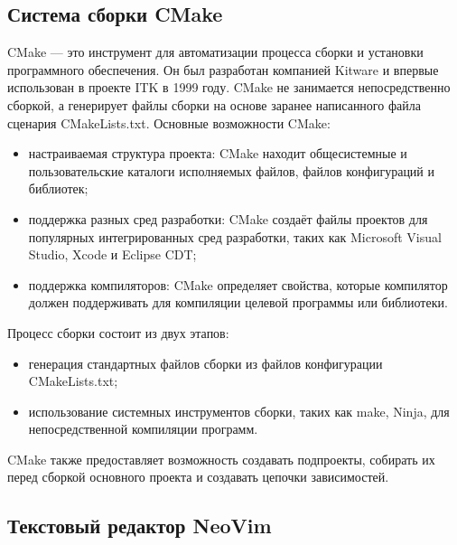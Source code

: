 \subsection{Система сборки CMake}
CMake --- это инструмент для автоматизации процесса сборки и установки программного обеспечения. Он был разработан компанией Kitware и впервые использован в проекте ITK в 1999 году. CMake не занимается непосредственно сборкой, а генерирует файлы сборки на основе заранее написанного файла сценария CMakeLists.txt.
Основные возможности CMake:
\begin{itemize}
\item настраиваемая структура проекта: CMake находит общесистемные и пользовательские каталоги исполняемых файлов, файлов конфигураций и библиотек;
\item поддержка разных сред разработки: CMake создаёт файлы проектов для популярных интегрированных сред разработки, таких как Microsoft Visual Studio, Xcode и Eclipse CDT;
\item поддержка компиляторов: CMake определяет свойства, которые компилятор должен поддерживать для компиляции целевой программы или библиотеки.
\end{itemize}

Процесс сборки состоит из двух этапов:
\begin{itemize}
\item генерация стандартных файлов сборки из файлов конфигурации CMakeLists.txt;
\item использование системных инструментов сборки, таких как make, Ninja, для непосредственной компиляции программ.
\end{itemize}

CMake также предоставляет возможность создавать подпроекты, собирать их перед сборкой основного проекта и создавать цепочки зависимостей.

\subsection{Текстовый редактор NeoVim}

